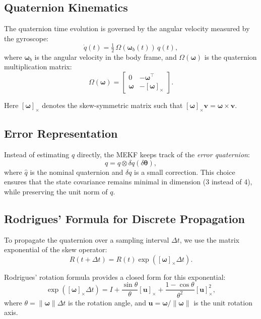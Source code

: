 \documentclass[10pt]{extarticle}
\begin{document}
\subsection{Quaternion Kinematics}
The quaternion time evolution is governed by the angular velocity measured by the gyroscope:
\begin{equation}
\dot q(t) = \tfrac{1}{2} \, \Omega(\bm\omega_b(t)) \, q(t),
\label{eq:quat_kinematics}
\end{equation}
where $\bm\omega_b$ is the angular velocity in the body frame, 
and $\Omega(\bm\omega)$ is the quaternion multiplication matrix:
\begin{equation}
\Omega(\bm\omega) =
\begin{bmatrix}
0 & -\bm\omega^\top \\
\bm\omega & -[\bm\omega]_\times
\end{bmatrix}.
\end{equation}

Here $[\bm\omega]_\times$ denotes the skew-symmetric matrix such that $[\bm\omega]_\times \bm v = \bm\omega \times \bm v$.

\subsection{Error Representation}
Instead of estimating $q$ directly, the MEKF keeps track of the \emph{error quaternion}:
\begin{equation}
q = \hat q \otimes \delta q(\delta\bm\theta),
\end{equation}
where $\hat q$ is the nominal quaternion and $\delta q$ is a small correction. 
This choice ensures that the state covariance remains minimal in dimension (3 instead of 4), 
while preserving the unit norm of $q$.

\subsection{Rodrigues' Formula for Discrete Propagation}
To propagate the quaternion over a sampling interval $\Delta t$, 
we use the matrix exponential of the skew operator:
\begin{equation}
R(t+\Delta t) = R(t) \exp\!\left([\bm\omega]_\times \Delta t\right).
\label{eq:rot_exp}
\end{equation}

Rodrigues' rotation formula provides a closed form for this exponential:
\begin{equation}
\exp([\bm\omega]_\times \Delta t) = I 
+ \frac{\sin \theta}{\theta} [\bm u]_\times
+ \frac{1 - \cos \theta}{\theta^2} [\bm u]_\times^2,
\label{eq:rodrigues}
\end{equation}
where $\theta = \|\bm\omega\| \Delta t$ is the rotation angle, 
and $\bm u = \bm\omega / \|\bm\omega\|$ is the unit rotation axis.
\end{document}

